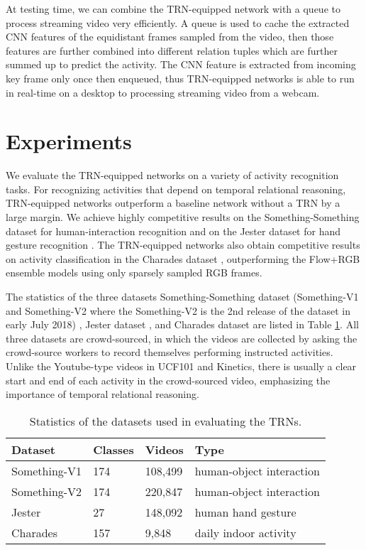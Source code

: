 \documentclass[runningheads]{llncs}
\begin{document}
At testing time, we can combine the TRN-equipped network with a queue to process streaming video very efficiently. A queue is used to cache the extracted CNN features of the equidistant frames sampled from the video, then those features are further combined into different relation tuples which are further summed up to predict the activity. The CNN feature is extracted from incoming key frame only once then enqueued, thus TRN-equipped networks is able to run in real-time on a desktop to processing streaming video from a webcam.

\section{Experiments}

We evaluate the TRN-equipped networks on a variety of activity recognition tasks. For recognizing activities that depend on temporal relational reasoning, TRN-equipped networks outperform a baseline network without a TRN by a large margin. We achieve highly competitive results on the Something-Something dataset for human-interaction recognition \cite{goyal2017something} and on the Jester dataset for hand gesture recognition \cite{jester}. The TRN-equipped networks also obtain competitive results on activity classification in the Charades dataset \cite{sigurdsson2016hollywood}, outperforming the Flow+RGB ensemble models \cite{sigurdsson2016asynchronous,sigurdsson2016hollywood} using only sparsely sampled RGB frames. 

The statistics of the three datasets Something-Something dataset (Something-V1 \cite{goyal2017something} and Something-V2 \cite{mahdisoltani2018fine} where the Something-V2 is the 2nd release of the dataset in early July 2018) \cite{goyal2017something,mahdisoltani2018fine}, Jester dataset \cite{jester}, and Charades dataset \cite{sigurdsson2016hollywood} are listed in Table \ref{datasets}. All three datasets are crowd-sourced, in which the videos are collected by asking the crowd-source workers to record themselves performing instructed activities. Unlike the Youtube-type videos in UCF101 and Kinetics, there is usually a clear start and end of each activity in the crowd-sourced video, emphasizing the importance of temporal relational reasoning.

\vspace{-8mm}
\begin{table}\caption{Statistics of the datasets used in evaluating the TRNs.}
\label{datasets}
\small
\centering
\begin{tabular}{p{2.4cm} p{1.5cm}  p{1.5cm}  p{4cm} }
\toprule      
Dataset & Classes & Videos & Type \\ 
\hline  
Something-V1 & 174 & 108,499 & human-object interaction \\ 
Something-V2 & 174 & 220,847 & human-object interaction  \\ 
Jester & 27 & 148,092 & human hand gesture \\
Charades & 157 & 9,848 & daily indoor activity \\
\bottomrule
\end{tabular}
\vspace{-10mm}
\end{table}
\end{document}
